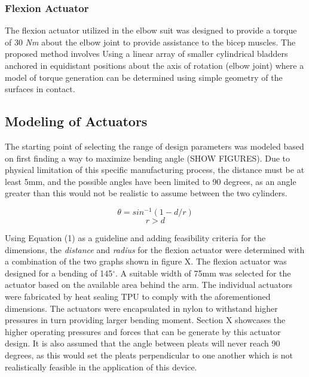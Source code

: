 \documentclass[letterpaper, 10 pt, conference]{ieeeconf}  %
\begin{document}
\subsubsection{Flexion Actuator}
The flexion actuator utilized in the elbow suit was designed to provide a torque of 30 \textit{Nm} about the elbow joint to provide assistance to the bicep muscles. The proposed method involves Using a linear array of smaller cylindrical bladders anchored in equidistant positions about the axis of rotation (elbow joint) where a model of torque generation can be determined using simple geometry of the surfaces in contact. 

\subsection{Modeling of Actuators}
The starting point of selecting the range of design parameters was modeled based on first finding a way to maximize bending angle (SHOW FIGURES). Due to physical limitation of this specific manufacturing process, the distance must be at least 5mm, and the possible angles have been limited to 90 degrees, as an angle greater than this would not be realistic to assume between the two cylinders.  

\begin{equation}\label{eq. X15}
	\theta=sin^{-1}(1-d/r) 
\end{equation}
\begin{equation}\label{eq. X15}
	r > d 
\end{equation}


Using Equation (1) as a guideline and adding feasibility criteria for the dimensions, the \textit{distance} and \textit{radius} for the flexion actuator were determined with a combination of the two graphs shown in figure X. The flexion actuator was designed for a bending of 145$^{\circ}$. A suitable width of 75mm was selected for the actuator based on the available area behind the arm. The individual actuators were fabricated by heat sealing TPU to comply with the aforementioned dimensions. The actuators were encapsulated in nylon to withstand higher pressures in turn providing larger bending moment.  Section X showcases the higher operating pressures and forces that can be generate by this actuator design.  It is also assumed that the angle between pleats will never reach 90 degrees, as this would set the pleats perpendicular to one another which is not realistically feasible in the application of this device.  
\end{document}
